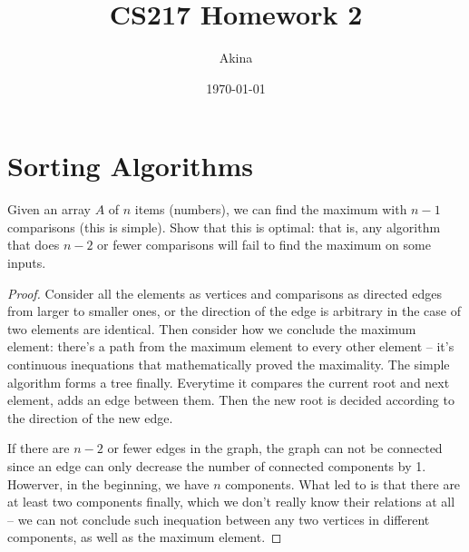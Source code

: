 \documentclass[11pt,a4paper,oneside]{article}
\renewcommand{\hwtitle} {CS217 Homework 2}
\renewcommand{\hwauthor}{Akina}
\renewcommand{\hwdate}{\today}
\begin{document}
\title{\hwtitle}
\author{\hwauthor}
\date{\hwdate}
\maketitle

\section*{Sorting Algorithms}
\begin{problem}{1}
	\statement
	Given an array $A$ of $n$ items (numbers), we can find the maximum with $n-1$ comparisons (this is simple).
	Show that this is optimal: that is, any algorithm that does $n-2$ or fewer comparisons will fail to find the maximum 
	on some inputs.
	\solution
	\begin{proof}
		Consider all the elements as vertices and comparisons as directed edges from larger to smaller ones, or the direction of the edge is arbitrary in the case of two elements are identical. Then consider how we conclude the maximum element: there's a path from the maximum element to every other element -- it's continuous inequations that mathematically proved the maximality.
		The simple algorithm forms a tree finally. Everytime it compares the current root and next element, adds an edge between them. Then the new root is decided according to the direction of the new edge.

		If there are $n - 2$ or fewer edges in the graph, the graph can not be connected since an edge can only decrease the number of connected components by 1. Howerver, in the beginning, we have $n$ components. What led to is that there are at least two components finally, which we don't really know their relations at all -- we can not conclude such inequation between any two vertices in different components, as well as the maximum element.
	\end{proof}
\end{problem}
\end{document}
